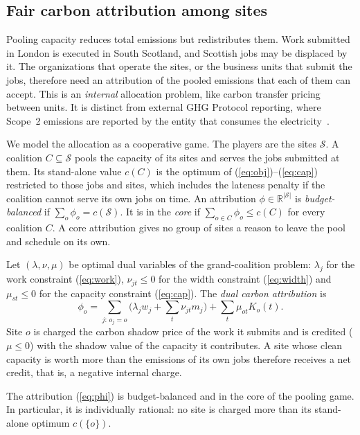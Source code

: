 \subsection{Fair carbon attribution among sites}\label{sec:fair}

Pooling capacity reduces total emissions but redistributes them. Work submitted in London is executed in South Scotland, and Scottish jobs may be displaced by it. The organizations that operate the sites, or the business units that submit the jobs, therefore need an attribution of the pooled emissions that each of them can accept. This is an \emph{internal} allocation problem, like carbon transfer pricing between units. It is distinct from external GHG Protocol reporting, where Scope~2 emissions are reported by the entity that consumes the electricity~\cite{ghg2015scope2}.

We model the allocation as a cooperative game. The players are the sites $\mathcal S$. A coalition $C\subseteq\mathcal S$ pools the capacity of its sites and serves the jobs submitted at them. Its stand-alone value $c(C)$ is the optimum of (\ref{eq:obj})--(\ref{eq:cap}) restricted to those jobs and sites, which includes the lateness penalty if the coalition cannot serve its own jobs on time. An attribution $\phi\in\mathbb{R}^{|\mathcal S|}$ is \emph{budget-balanced} if $\sum_o\phi_o=c(\mathcal S)$. It is in the \emph{core} if $\sum_{o\in C}\phi_o\le c(C)$ for every coalition $C$. A core attribution gives no group of sites a reason to leave the pool and schedule on its own.

Let $(\lambda,\nu,\mu)$ be optimal dual variables of the grand-coalition problem: $\lambda_j$ for the work constraint (\ref{eq:work}), $\nu_{jt}\le 0$ for the width constraint (\ref{eq:width}) and $\mu_{st}\le 0$ for the capacity constraint (\ref{eq:cap}). The \emph{dual carbon attribution} is
\begin{equation}\label{eq:phi}
\phi_o=\sum_{j:\,o_j=o}\Big(\lambda_j w_j+\sum_t \nu_{jt}m_j\Big)+\sum_t\mu_{ot}K_o(t).
\end{equation}
Site $o$ is charged the carbon shadow price of the work it submits and is credited ($\mu\le 0$) with the shadow value of the capacity it contributes. A site whose clean capacity is worth more than the emissions of its own jobs therefore receives a net credit, that is, a negative internal charge.

\begin{theorem}\label{thm:core}
The attribution (\ref{eq:phi}) is budget-balanced and in the core of the pooling game. In particular, it is individually rational: no site is charged more than its stand-alone optimum $c(\{o\})$.
\end{theorem}

